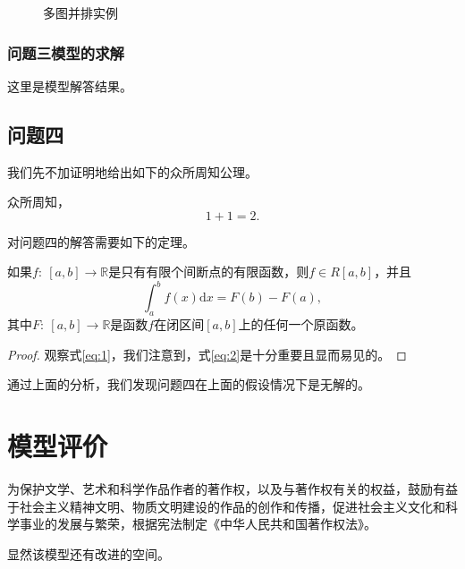 \documentclass[nogbt]{my_cumcmthesis}
\begin{document}
\begin{figure}[htbp]
\begin{minipage}[c]{0.48\textwidth}
            \label{fig:duet}
        \end{minipage}
        \caption{多图并排实例}
        \label{fig:eg3}
    \end{figure}
\subsubsection{问题三模型的求解}
    这里是模型解答结果。
\subsection{问题四}
    我们先不加证明地给出如下的众所周知公理。
    \begin{lemma}[众所周知公理]
        众所周知，
        \begin{equation}
            1 + 1 = 2.
            \label{eq:1}
        \end{equation}
        \label{lma:wellknown}
    \end{lemma}
    对问题四的解答需要如下的定理。
    \begin{theorem}
        如果$f:\ [a,b] \rightarrow \mathbb{R}$是只有有限个间断点的有限函数，则$f\in R[a,b]$，并且
    \begin{equation}
        \int_{a}^{b}f(x)\mathrm{d}x = F(b) - F(a),
        \label{eq:2}
    \end{equation}
    其中$F:\ [a,b] \rightarrow \mathbb{R}$是函数$f$在闭区间$[a,b]$上的任何一个原函数。
    \label{thm:NL}
    \end{theorem}
    \begin{proof}
        观察式\eqref{eq:1}，我们注意到，式\eqref{eq:2}是十分重要且显而易见的。
    \end{proof}
    通过上面的分析，我们发现问题四在上面的假设情况下是无解的。

\section{模型评价}
    为保护文学、艺术和科学作品作者的著作权，以及与著作权有关的权益，鼓励有益于社会主义精神文明、物质文明建设的作品的创作和传播，促进社会主义文化和科学事业的发展与繁荣，根据宪法制定《中华人民共和国著作权法》。
    
    显然该模型还有改进的空间。
\newpage
\end{document}
